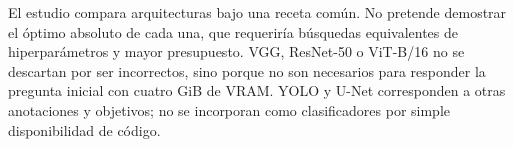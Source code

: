 El estudio compara arquitecturas bajo una receta común. No pretende demostrar el óptimo absoluto de cada una, que requeriría búsquedas equivalentes de hiperparámetros y mayor presupuesto. VGG, ResNet-50 o ViT-B/16 no se descartan por ser incorrectos, sino porque no son necesarios para responder la pregunta inicial con cuatro GiB de VRAM. YOLO y U-Net corresponden a otras anotaciones y objetivos; no se incorporan como clasificadores por simple disponibilidad de código.
